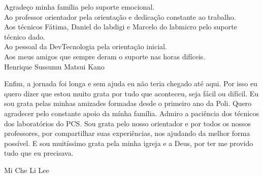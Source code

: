 \begin{agradecimentos}
\vspace{10mm}
Agradeço minha família pelo suporte emocional.\\
Ao professor orientador pela orientação e dedicação constante ao trabalho.\\
Aos técnicos Fátima, Daniel do labdigi e Marcelo do labmicro pelo suporte técnico dado.\\
Ao pessoal da DevTecnologia pela orientação inicial.\\
Aos meus amigos que sempre deram o suporte nas horas difíceis.\\

\vspace{10mm}
Henrique Sussumu Matsui Kano
\vspace{40mm}

Enfim, a jornada foi longa e sem ajuda eu não teria chegado até aqui. Por isso eu quero dizer que estou muito grata por tudo que aconteceu, seja fácil ou difícil. Eu sou grata pelas minhas amizades formadas desde o primeiro ano da Poli. Quero agradecer pelo constante apoio da mínha família. Admiro a paciência dos técnicos dos laboratórios do PCS. Sou grata pelo nosso orientador e por todos os nossos professores, por compartilhar suas experiências, nos ajudando da melhor forma possível. E sou muitíssimo grata pela minha igreja e a Deus, por ter me provido tudo que eu precisava.

\vspace{10mm}
Mi Che Li Lee
\hfill
\end{agradecimentos}
